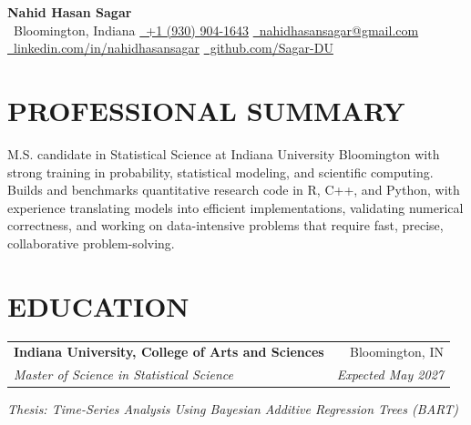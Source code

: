 \documentclass[10pt,letterpaper]{article}
\makeatletter
\newcommand{\resumeEntry}[4]{%
	\begin{tabularx}{\textwidth}{@{}Xr@{}}
		\textbf{#1} & #2 \\
		\textit{#3} & \textit{#4}
	\end{tabularx}%
}
\newcommand{\contactsep}{\qquad}
\makeatother
\begin{document}
\normalsize

\begin{center}
	{\LARGE
	 \textbf{Nahid Hasan Sagar}}\\[2.2pt]

	{\footnotesize
		\faMapMarker*\, Bloomington, Indiana
		\contactsep
		\href{tel:+19309041643}{\faPhone*\, +1 (930) 904-1643}
		\contactsep
		\href{mailto:nahidhasansagar@gmail.com}{\faEnvelope\, nahidhasansagar@gmail.com}
	}\\[-0.2pt]

	{\footnotesize
		\href{https://www.linkedin.com/in/nahidhasansagar/}{\faLinkedinIn\, linkedin.com/in/nahidhasansagar}
		\contactsep
		\href{https://github.com/Sagar-DU}{\faGithub\, github.com/Sagar-DU}
	}
\end{center}

\vspace{-5pt}

\section*{PROFESSIONAL SUMMARY}

M.S. candidate in Statistical Science at Indiana University Bloomington with strong training in probability, statistical modeling, and scientific computing. Builds and benchmarks quantitative research code in R, C++, and Python, with experience translating models into efficient implementations, validating numerical correctness, and working on data-intensive problems that require fast, precise, collaborative problem-solving.

\section*{EDUCATION}

\resumeEntry
	{Indiana University, College of Arts and Sciences}
	{Bloomington, IN}
	{Master of Science in Statistical Science}
	{Expected May 2027}

\vspace{0.4pt}

\textit{Thesis: Time-Series Analysis Using Bayesian Additive Regression Trees (BART)}
\end{document}
